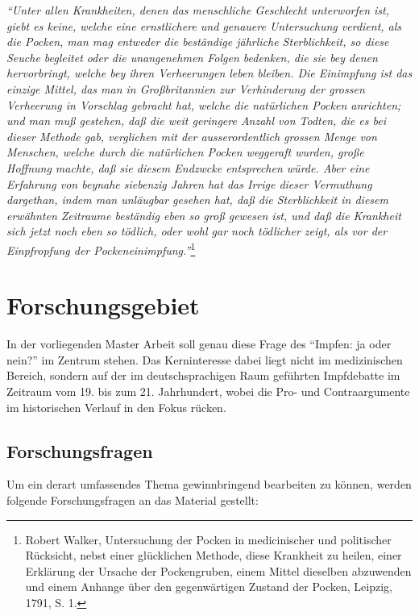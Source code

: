 \documentclass[
    a4paper,
    12pt,
    hyphens,
    chapterprefix=true,
    headheight=33pt,
    footheight=29pt,
    headings=optiontohead,
]{scrartcl}
\begin{document}
\begin{center}
\textit{"`Unter allen Krankheiten, denen das menschliche Geschlecht unterworfen ist, giebt es keine, welche eine ernstlichere und genauere Untersuchung verdient, als die Pocken, man mag entweder die beständige jährliche Sterblichkeit, so diese Seuche begleitet oder die unangenehmen Folgen bedenken, die sie bey denen hervorbringt, welche bey ihren Verheerungen leben bleiben. Die Einimpfung ist das einzige Mittel, das man in Großbritannien zur Verhinderung der grossen Verheerung in Vorschlag gebracht hat, welche die natürlichen Pocken anrichten; und man muß gestehen, daß die weit geringere Anzahl von Todten, die es bei dieser Methode gab, verglichen mit der ausserordentlich grossen Menge von Menschen, welche durch die natürlichen Pocken weggeraft wurden, große Hoffnung machte, daß sie diesem Endzwcke entsprechen würde. Aber eine Erfahrung von beynahe siebenzig Jahren hat das Irrige dieser Vermuthung dargethan, indem man unläugbar gesehen hat, daß die Sterblichkeit in diesem erwähnten Zeitraume beständig eben so groß gewesen ist, und daß die Krankheit sich jetzt noch eben so tödlich, oder wohl gar noch tödlicher zeigt, als vor der Einpfropfung der Pockeneinimpfung."'}\footnote{Robert Walker, Untersuchung der Pocken in medicinischer und politischer Rücksicht, nebst einer glücklichen Methode, diese Krankheit zu heilen, einer Erklärung der Ursache der Pockengruben, einem Mittel dieselben abzuwenden und einem Anhange über den gegenwärtigen Zustand der Pocken, Leipzig, 1791, S. 1.}
\end{center}


\section{Forschungsgebiet}

In der vorliegenden Master Arbeit soll genau diese Frage des "`Impfen: ja oder nein?"' im Zentrum stehen. Das Kerninteresse dabei liegt nicht im medizinischen Bereich, sondern auf der im deutschsprachigen Raum geführten Impfdebatte im Zeitraum vom 19. bis zum 21. Jahrhundert, wobei die Pro- und Contraargumente im historischen Verlauf in den Fokus rücken.

\subsection{Forschungsfragen}
Um ein derart umfassendes Thema gewinnbringend bearbeiten zu können, werden folgende Forschungsfragen an das Material gestellt:
\end{document}
